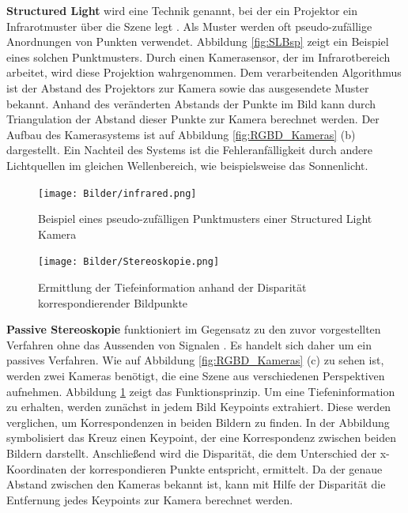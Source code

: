 \textbf{Structured Light} wird eine Technik genannt, bei der ein Projektor ein Infrarotmuster über die Szene legt \cite{Shao2014}. Als Muster werden oft pseudo-zufällige Anordnungen von Punkten verwendet. Abbildung \ref{fig:SLBsp} zeigt ein Beispiel eines solchen Punktmusters. Durch einen Kamerasensor, der im Infrarotbereich arbeitet, wird diese Projektion wahrgenommen. Dem verarbeitenden Algorithmus ist der Abstand des Projektors zur Kamera sowie das ausgesendete Muster bekannt. Anhand des veränderten Abstands der Punkte im Bild kann durch Triangulation der Abstand dieser Punkte zur Kamera berechnet werden. Der Aufbau des Kamerasystems ist auf Abbildung \ref{fig:RGBD_Kameras} (b) dargestellt. Ein Nachteil des Systems ist die Fehleranfälligkeit durch andere Lichtquellen im gleichen Wellenbereich, wie beispielsweise das Sonnenlicht. 

\begin{figure}[htb]
	\centering
	\begin{minipage}[t]{0.45\linewidth}
		\centering
		\texttt{[image: Bilder/infrared.png]}
		\caption{Beispiel eines pseudo-zufälligen Punktmusters einer Structured Light Kamera}
		\label{fig:SLBsp}
	\end{minipage}
	\hfill
	\begin {minipage}[t]{0.45\linewidth}
		\centering
		\texttt{[image: Bilder/Stereoskopie.png]}
		\caption{Ermittlung der Tiefeinformation anhand der Disparität korrespondierender Bildpunkte }
		\label{fig:Stereoskopie}
	\end{minipage}
\end{figure}
 
\textbf{Passive Stereoskopie} funktioniert im Gegensatz zu den zuvor vorgestellten Verfahren ohne das Aussenden von Signalen \cite{Modrow2008}. Es handelt sich daher um ein passives Verfahren. Wie auf Abbildung \ref{fig:RGBD_Kameras} (c) zu sehen ist, werden zwei Kameras benötigt, die eine Szene aus verschiedenen Perspektiven aufnehmen. Abbildung \ref{fig:Stereoskopie} zeigt das Funktionsprinzip. Um eine Tiefeninformation zu erhalten, werden zunächst in jedem Bild Keypoints extrahiert. Diese werden verglichen, um Korrespondenzen in beiden Bildern zu finden. In der Abbildung symbolisiert das Kreuz einen Keypoint, der eine Kor\-re\-spon\-denz zwischen beiden Bildern darstellt. Anschließend wird die Disparität, die dem Unterschied der x-Koordinaten der korrespondieren Punkte entspricht, ermittelt. Da der genaue Abstand zwischen den Kameras bekannt ist, kann mit Hilfe der Dis\-pa\-ri\-tät die Entfernung jedes Keypoints zur Kamera berechnet werden.

